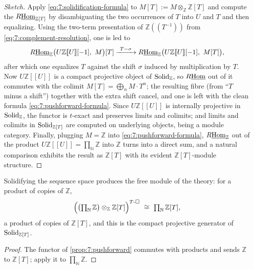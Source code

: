 \begin{proof}[Sketch]
Apply \eqref{eq:7:solidification-formula} to $M[T]:=M\otimes_{\mathbb{Z}}
\mathbb{Z}[T]$ and compute the $R\underline{\operatorname{Hom}}_{\mathbb{Z}[T]}$ by disambiguating the
two occurrences of $T$ into $U$ and $T$ and then equalizing. Using the two-term
presentation of $\mathbb{Z}(\!(T^{-1})\!)$ from
\eqref{eq:7:complement-resolution}, one is led to
\begin{equation*}
R\iHom_{\mathbb{Z}}\bigl(U\mathbb{Z}[\![U]\!][-1],\ M\bigr)[T]
\xrightarrow{\ T-\sigma\ }
R\iHom_{\mathbb{Z}}\bigl(U\mathbb{Z}[\![U]\!][-1],\ M[T]\bigr),
\end{equation*}
after which one equalizes $T$ against the shift $\sigma$ induced by
multiplication by $T$. Now $U\mathbb{Z}[\![U]\!]$ is a compact projective object
of $\mathrm{Solid}_{\mathbb{Z}}$, so $R\underline{\operatorname{Hom}}$ out of it commutes with the colimit
$M[T]=\bigoplus_n M\cdot T^n$; the resulting fibre (from ``$T$ minus a shift'')
together with the extra shift cancel, and one is left with the clean formula
\eqref{eq:7:pushforward-formula}. Since $U\mathbb{Z}[\![U]\!]$ is internally
projective in $\mathrm{Solid}_{\mathbb{Z}}$, the functor is $t$-exact and preserves
limits and colimits; and limits and colimits in $\mathrm{Solid}_{\mathbb{Z}[T]}$ are
computed on underlying objects, being a module category. Finally, plugging
$M=\mathbb{Z}$ into \eqref{eq:7:pushforward-formula}, $R\underline{\operatorname{Hom}}_{\mathbb{Z}}$ out
of the product $U\mathbb{Z}[\![U]\!]=\prod_{\mathbb{N}}\mathbb{Z}$ into
$\mathbb{Z}$ turns into a direct sum, and a natural comparison exhibits the
result as $\mathbb{Z}[T]$ with its evident $\mathbb{Z}[T]$-module structure.
\end{proof}

\begin{corollary}
\label{cor:7:generator}
Solidifying the sequence space produces the free module of the theory: for a
product of copies of $\mathbb{Z}$,
\begin{equation*}
\Bigl(\bigl(\textstyle\prod_{\mathbb{N}}\mathbb{Z}\bigr)\otimes_{\mathbb{Z}}
\mathbb{Z}[T]\Bigr)^{\Tsolid}\ \cong\ \prod_{\mathbb{N}}\mathbb{Z}[T],
\end{equation*}
a product of copies of $\mathbb{Z}[T]$, and this is the compact projective
generator of $\mathrm{Solid}_{\mathbb{Z}[T]}$.
\end{corollary}

\begin{proof}
The functor of \cref{prop:7:pushforward} commutes with products and sends
$\mathbb{Z}$ to $\mathbb{Z}[T]$; apply it to $\prod_{\mathbb{N}}\mathbb{Z}$.
\end{proof}

